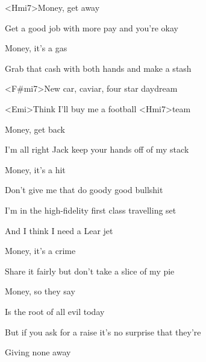 
\zs

<Hmi7>Money, get away

Get a good job with more pay and you're okay

Money, it's a gas

Grab that cash with both hands and make a stash
\ks

\zr
<F#mi7>New car, caviar, four star daydream

<Emi>Think I'll buy me a football <Hmi7>team
\kr

\zs
Money, get back

I'm all right Jack keep your hands off of my stack

Money, it's a hit

Don't give me that do goody good bullshit
\ks

\zr
I'm in the high-fidelity first class travelling set

And I think I need a Lear jet
\kr

\zs
Money, it's a crime

Share it fairly but don't take a slice of my pie

Money, so they say

Is the root of all evil today

\ks

\zr
But if you ask for a raise it's no surprise that they're

Giving none away
\kr

\kp
